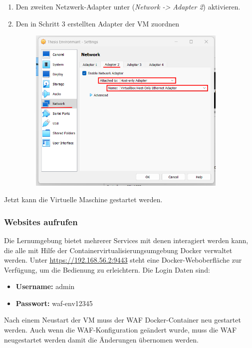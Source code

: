 \begin{enumerate}
\begin{figure}[!hbt]
    \end{figure}
    \item Den zweiten Netzwerk-Adapter unter (\textit{Network -> Adapter 2}) aktivieren.
    \item Den in Schritt 3 erstellten Adapter der VM zuordnen
    \begin{figure}[!hbt]
        \centering
        \includegraphics[width=0.9\textwidth]{./images/vm-ho-config.png}
    \end{figure}
\end{enumerate}
\pagebreak

Jetzt kann die Virtuelle Maschine gestartet werden.

\subsubsection{Websites aufrufen}
Die Lernumgebung bietet mehrerer Services mit denen interagiert werden kann, die alle mit Hilfe der Containervirtualisierungsumgebung Docker verwaltet werden.
Unter \href{https://192.168.56.2:9443}{\underline{https://192.168.56.2:9443}} steht eine Docker-Weboberfläche zur Verfügung, um die Bedienung zu erleichtern.
Die Login Daten sind:
\begin{itemize}
    \item \textbf{Username:} admin
    \item \textbf{Passwort:} waf-env12345
\end{itemize}

Nach einem Neustart der VM muss der WAF Docker-Container neu gestartet werden.
Auch wenn die WAF-Konfiguration geändert wurde, muss die WAF neugestartet werden damit die Änderungen übernomen werden.

